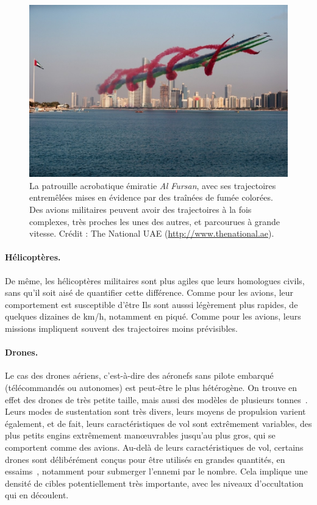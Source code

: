 	\begin{figure}[H]
		\centering
		\includegraphics[width=\textwidth]{figures/ch1/AlFursan}
		\caption{La patrouille acrobatique émiratie \emph{Al Fursan}, avec ses trajectoires entremêlées mises en évidence par des traînées de fumée colorées. Des avions militaires peuvent avoir des trajectoires à la fois complexes, très proches les unes des autres, et parcourues à grande vitesse. Crédit : The National UAE (\url{http://www.thenational.ae}).}
		\label{fig:alfursan}
	\end{figure}
	
	\paragraph{Hélicoptères.}
	De même, les hélicoptères militaires sont plus agiles que leurs homologues civils, sans qu'il soit aisé de quantifier cette différence. Comme pour les avions, leur comportement est susceptible d'être  Ils sont ausssi légèrement plus rapides, de quelques dizaines de km/h, notamment en piqué. Comme pour les avions, leurs missions impliquent souvent des trajectoires moins prévisibles.
	
	\paragraph{Drones.}
	Le cas des drones aériens, c'est-à-dire des aéronefs sans pilote embarqué (télécommandés ou autonomes) est peut-être le plus hétérogène. On trouve en effet des drones de très petite taille, mais aussi des modèles de plusieurs tonnes~\cite{reaper}. Leurs modes de sustentation sont très divers, leurs moyens de propulsion varient également, et de fait, leurs caractéristiques de vol sont extrêmement variables, des plus petits engins extrêmement manœuvrables jusqu'au plus gros, qui se comportent comme des avions. Au-delà de leurs caractéristiques de vol, certains drones sont délibérément conçus pour être utilisés en grandes quantités, en essaims~\cite{locust, alonso2016distributed, saska2014autonomous}, notamment pour submerger l'ennemi par le nombre. Cela implique une densité de cibles potentiellement très importante, avec les niveaux d'occultation qui en découlent.
	
